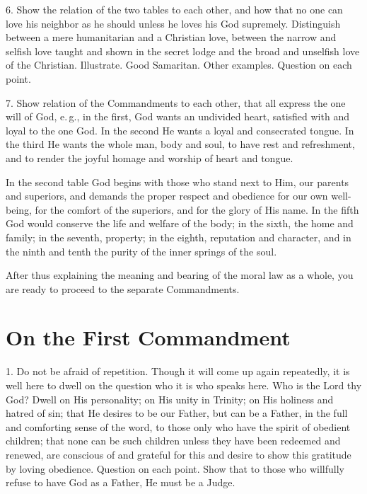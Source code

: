 6. Show the relation of the two tables to each other, and how that no one can love his neighbor as he should unless he loves his God supremely. Distinguish between a mere humanitarian and a Christian love, between the narrow and selfish love taught and shown in the secret lodge and the broad and unselfish love of the Christian. Illustrate. Good Samaritan. Other examples. Question on each point.

 7. Show relation of the Commandments to each other, that all express the one will of God, e.\,g., in the first, God wants an undivided heart, satisfied with and loyal to the one God. In the second He wants a loyal and consecrated tongue. In the third He wants the whole man, body and soul, to have rest and refreshment, and to render the joyful homage and worship of heart and tongue.

In the second table God begins with those who stand next to Him, our parents and superiors, and demands the proper respect and obedience for our own well-being, for the comfort of the superiors, and for the glory of His name. In the fifth God would conserve the life and welfare of the body; in the sixth, the home and family; in the seventh, property; in the eighth, reputation and character, and in the ninth and tenth the purity of the inner springs of the soul.

After thus explaining the meaning and bearing of the moral law as a whole, you are ready to proceed to the separate Commandments.

\section{On the First Commandment}

1. Do not be afraid of repetition. Though it will come up again repeatedly, it is well here to dwell on the question who it is who speaks here.  Who is the Lord thy God? Dwell on His personality; on His unity in Trinity; on His holiness and hatred of sin;
that He desires to be our Father, but can be a Father, in the full and comforting sense of the word, to those only who have the spirit of obedient children; that none can be such children unless they have been redeemed and renewed, are conscious of and grateful for this and desire to show this gratitude by loving obedience. Question on each point. Show that to those who willfully refuse to have God as a Father, He must be a Judge.

